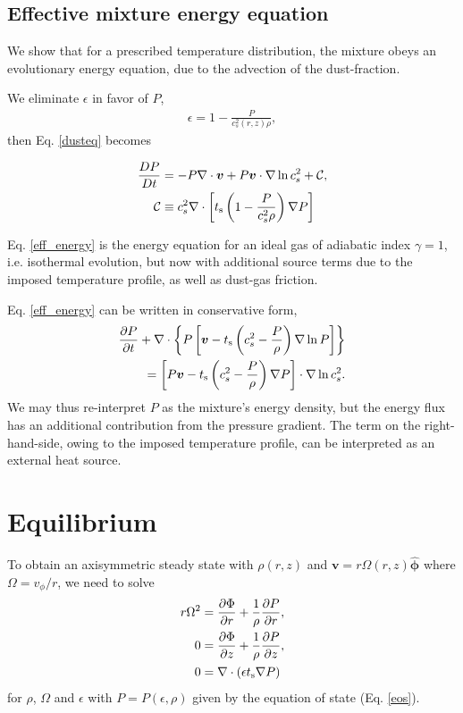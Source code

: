 \subsection{Effective mixture energy equation}
We show that for a prescribed temperature distribution, the mixture
obeys an evolutionary energy equation, due to the advection of the
dust-fraction. 

We eliminate $\epsilon$ in favor of $P$, 
\begin{align}
  \epsilon = 1 - \frac{P}{c_s^2(r,z)\rho}, 
\end{align}
then Eq. \ref{dusteq} becomes

\begin{align}
\frac{DP}{Dt} &= - P \nabla\cdot\bm{v} + P\bm{v}\cdot\nabla\ln{c_s^2}
                + \mathcal{C},  \label{eff_energy} \\
\mathcal{C}&\equiv c_s^2 \nabla\cdot\left[t_\mathrm{s}\left(1 - \frac{P}{c_s^2\rho}\right)\nabla
  P\right]
\end{align}

Eq. \ref{eff_energy} is the energy equation for an ideal gas of adiabatic index
$\gamma=1$, i.e. isothermal evolution, but now with additional source 
terms due to the imposed temperature profile, as well as dust-gas
friction.   

Eq. \ref{eff_energy} can be written in conservative form,
\begin{align*}
  \frac{\partial P}{ \partial t} + \nabla\cdot\left\{P\left[\bm{v} -
      t_\mathrm{s}\left(c_s^2 - \frac{P}{\rho}\right)\nabla\ln{P}\right]
    \right\}\\
  = \left[P\bm{v} - t_\mathrm{s}\left(c_s^2 - \frac{P}{\rho}\right)\nabla
    P\right]\cdot\nabla\ln{c_s^2}. 
\end{align*}
We may thus re-interpret $P$ as the mixture's energy density, but the
energy flux has an additional contribution from the pressure
gradient. The term on the right-hand-side, owing to the imposed
temperature profile, can be interpreted as an external heat source. 

\section{Equilibrium}
To obtain an axisymmetric steady state with $\rho(r,z)$ and 
$\bm{v}=r\Omega(r,z)\hat{\bm{\phi}}$ where $\Omega = v_\phi/r$, 
we need to solve 
\begin{align}
  r\Omega^2 &= \frac{\partial \Phi}{\partial r} + \frac{1}{\rho}\frac{\partial P}{\partial
    r},\label{steady_momr}\\
  0 & = \frac{\partial\Phi}{\partial z} + \frac{1}{\rho}\frac{\partial P}{\partial z},\label{steady_momz}\\
  0 & = \nabla\cdot\left(\epsilon t_\mathrm{s}\nabla P\right) \label{steady_dust}
\end{align}
for $\rho$, $\Omega$ and $\epsilon$ with $P=P(\epsilon,\rho)$ given by
the equation of state (Eq. \ref{eos}). 

